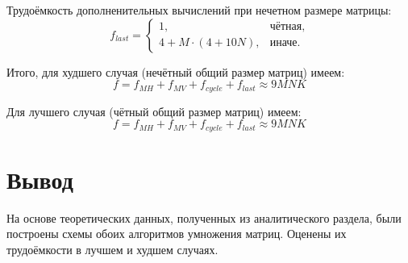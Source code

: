 Трудоёмкость дополненительных вычислений при нечетном размере матрицы:
\begin{equation}
	\label{for:impr_last}
	f_{last} = 
	\begin{cases}
		1, & \text{чётная,}\\
		4 + M \cdot (4 + 10N), & \text{иначе.}
	\end{cases}
\end{equation}

Итого, для худшего случая (нечётный общий размер матриц) имеем:
\begin{equation}
	\label{for:bad_impr}
	f = f_{MH} + f_{MV} + f_{cycle} + f_{last} \approx 9MNK
\end{equation}

Для лучшего случая (чётный общий размер матриц) имеем:
\begin{equation}
	\label{for:good_impr}
	f = f_{MH} + f_{MV} + f_{cycle} + f_{last} \approx 9MNK
\end{equation}


\section*{Вывод}

На основе теоретических данных, полученных из аналитического раздела, были построены схемы обоих алгоритмов умножения матриц.  Оценены их трудоёмкости в лучшем и худшем случаях.
